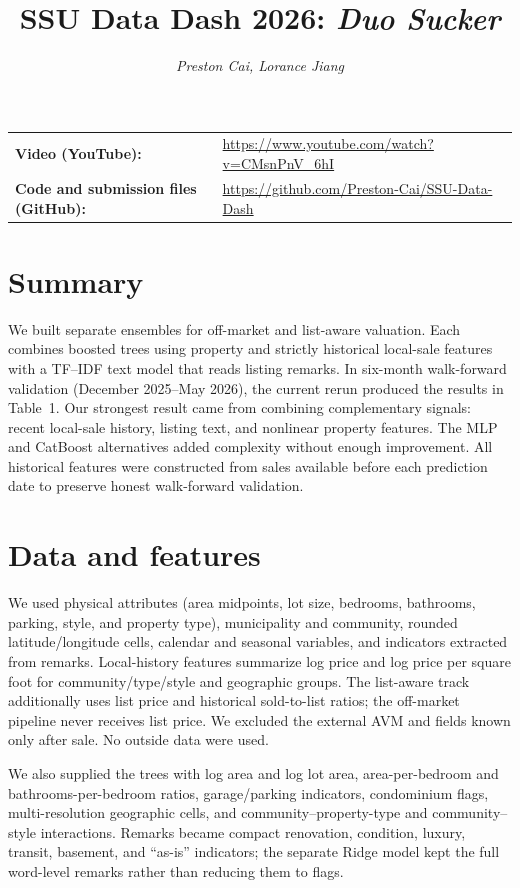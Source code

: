 \documentclass[11pt]{article}
\title{SSU Data Dash 2026: \textit{Duo Sucker}}
\author{\textit{Preston Cai, Lorance Jiang}}
\date{}
\begin{document}
\maketitle

\noindent\begin{tabular}{@{}ll}
\textbf{Video (YouTube):} & \url{https://www.youtube.com/watch?v=CMsnPnV_6hI} \\
\textbf{Code and submission files (GitHub):} & \url{https://github.com/Preston-Cai/SSU-Data-Dash} \\
\end{tabular}

\section*{Summary}
We built separate ensembles for off-market and list-aware valuation.  Each combines
boosted trees using property and strictly historical local-sale features with a
TF--IDF text model that reads listing remarks.  In six-month walk-forward
validation (December 2025--May 2026), the current rerun produced the results in
Table~1.  Our strongest result came from combining complementary signals:
recent local-sale history, listing text, and nonlinear property features.
The MLP and CatBoost alternatives added complexity without enough improvement.
All historical features were constructed from sales available before each
prediction date to preserve honest walk-forward validation.

\section{Data and features}
We used physical attributes (area midpoints, lot size, bedrooms, bathrooms,
parking, style, and property type), municipality and community, rounded
latitude/longitude cells, calendar and seasonal variables, and indicators
extracted from remarks.  Local-history features summarize log price and log
price per square foot for community/type/style and geographic groups.  The
list-aware track additionally uses list price and historical sold-to-list
ratios; the off-market pipeline never receives list price.  We excluded the
external AVM and fields known only after sale.  No outside data were used.

We also supplied the trees with log area and log lot area, area-per-bedroom
and bathrooms-per-bedroom ratios, garage/parking indicators, condominium
flags, multi-resolution geographic cells, and community--property-type and
community--style interactions.  Remarks became compact renovation, condition,
luxury, transit, basement, and ``as-is'' indicators; the separate Ridge model
kept the full word-level remarks rather than reducing them to flags.
\end{document}
